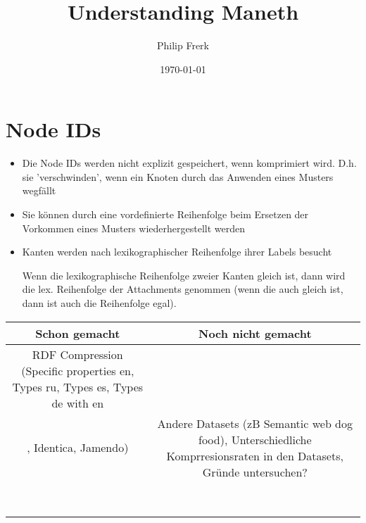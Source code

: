 \documentclass[a4paper]{scrartcl}
\title{Understanding Maneth}
\author{Philip Frerk}
\date{\today}
\begin{document}
\maketitle

\section{Node IDs}

\begin{itemize}
	\item Die Node IDs werden nicht explizit gespeichert, wenn komprimiert wird. D.h. sie 'verschwinden', wenn ein Knoten durch das Anwenden eines Musters wegfällt
	\item Sie können durch eine vordefinierte Reihenfolge beim Ersetzen der Vorkommen eines Musters wiederhergestellt werden
	\item Kanten werden nach lexikographischer Reihenfolge ihrer Labels besucht
	
	Wenn die lexikographische Reihenfolge zweier Kanten gleich ist, dann wird die lex. Reihenfolge der Attachments genommen (wenn die auch gleich ist, dann ist auch die Reihenfolge egal).
\end{itemize}

\begin{tabular}{|c|c|}
	\hline 
	Schon gemacht & Noch nicht gemacht  \\ 
	\hline 
	RDF Compression (Specific properties en,  Types ru, Types es, Types de with en\\, Identica, Jamendo)&  Andere Datasets (zB Semantic web dog food), Unterschiedliche Komprresionsraten in den Datasets, Gründe untersuchen?\\ 
	\hline 
	&  \\ 
	\hline 
	&  \\ 
	\hline 
	&  \\ 
	\hline 
	&  \\ 
	\hline 
	&  \\ 
	\hline 
	&  \\ 
	\hline 
	&  \\ 
	\hline 
	&  \\ 
	\hline 
\end{tabular} 
\end{document}

